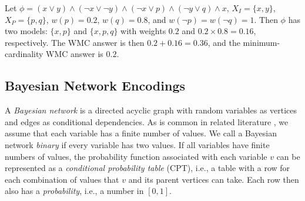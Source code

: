 \begin{example} \label{example:1}
  Let $\phi = (x \lor y) \land (\neg x \lor \neg y) \land (\neg x \lor p) \land
  (\neg y \lor q) \land x$, $X_I = \{ x, y \}$, $X_P = \{ p, q \}$, $w(p) =
  0.2$, $w(q) = 0.8$, and $w(\neg p) = w(\neg q) = 1$. Then $\phi$ has two
  models: $\{x, p\}$ and $\{ x, p, q \}$ with weights $0.2$ and $0.2 \times 0.8
  = 0.16$, respectively. The WMC answer is then $0.2 + 0.16 = 0.36$, and the
  minimum-cardinality WMC answer is $0.2$.
\end{example}

\subsection{Bayesian Network Encodings} \label{sec:encodings}

A \emph{Bayesian network} is a directed acyclic graph with random variables as
vertices and edges as conditional dependencies. As is common in related
literature
\citep{DBLP:conf/kr/Darwiche02,DBLP:conf/aaai/SangBK05}, we assume that each
variable has a finite number of values. We call a Bayesian network \emph{binary}
if every variable has two values. If all variables have finite numbers of
values, the probability function associated with each variable $v$ can be
represented as a \emph{conditional probability table} (CPT), i.e., a table
with a row for each combination of values that $v$ and its parent vertices can
take. Each row then also has a \emph{probability}, i.e., a number in $[0, 1]$.

